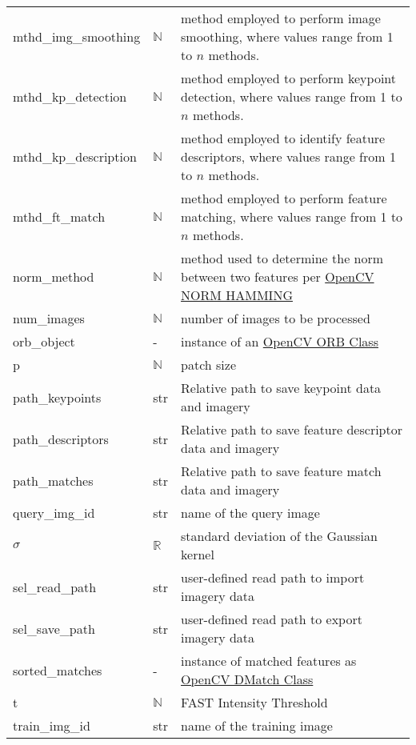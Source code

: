 \documentclass[12pt, titlepage]{article}
\begin{document}
\begin{longtable*}{l l p{12cm}}
mthd\_img\_smoothing & $\mathbb{N}$ & method employed to perform image smoothing, where values range from 1 to $n$ methods.\\
mthd\_kp\_detection & $\mathbb{N}$ & method employed to perform keypoint detection, where values range from 1 to $n$ methods.\\
mthd\_kp\_description & $\mathbb{N}$ & method employed to identify feature descriptors, where values range from 1 to $n$ methods.\\
mthd\_ft\_match & $\mathbb{N}$ & method employed to perform feature matching, where values range from 1 to $n$ methods.\\
norm\_method & $\mathbb{N}$ & method used to determine the norm between two features per \href{https://docs.opencv.org/4.x/d2/de8/group__core__array.html#ggad12cefbcb5291cf958a85b4b67b6149fa4b063afd04aebb8dd07085a1207da727}{OpenCV NORM HAMMING}\\ 
num\_images & $\mathbb{N}$ & number of images to be processed\\
orb\_object & - &	instance of an \href{https://docs.opencv.org/3.4/db/d95/classcv_1_1ORB.html}{OpenCV ORB Class}\\
p	& $\mathbb{N}$ & patch size\\
path\_keypoints	& str	& Relative path to save keypoint data and imagery\\
path\_descriptors & str	& Relative path to save feature descriptor data and imagery\\
path\_matches	& str	& Relative path to save feature match data and imagery\\
query\_img\_id & str & name of the query image\\
$\sigma$ & $\mathbb{R}$ & standard deviation of the Gaussian kernel\\
sel\_read\_path & str & user-defined read path to import imagery data\\
sel\_save\_path & str & user-defined read path to export imagery data\\
sorted\_matches & - & instance of matched features as \href{https://docs.opencv.org/3.4/d4/de0/classcv_1_1DMatch.html}{OpenCV DMatch Class} \\
t & $\mathbb{N}$ & FAST Intensity Threshold \\
train\_img\_id & str & name of the training image\\


\bottomrule
\end{longtable*}
\end{document}
